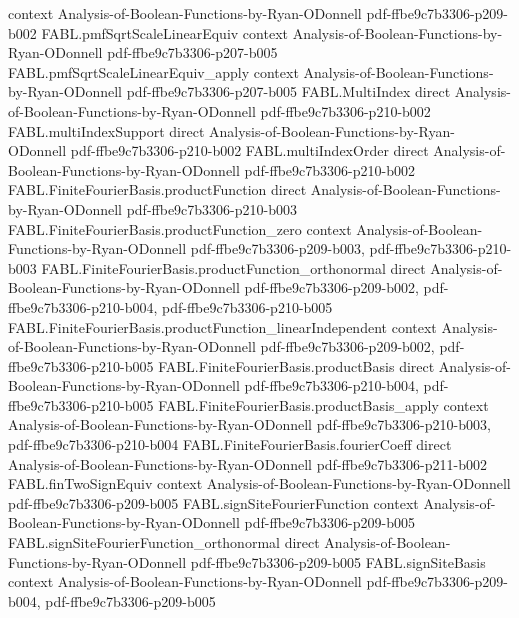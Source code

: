 \begin{theorem}
  {context}
  {Analysis-of-Boolean-Functions-by-Ryan-ODonnell}
  {pdf-ffbe9c7b3306-p209-b002}
\proofstep
  {FABL.pmfSqrtScaleLinearEquiv}
  {context}
  {Analysis-of-Boolean-Functions-by-Ryan-ODonnell}
  {pdf-ffbe9c7b3306-p207-b005}
\proofstep
  {FABL.pmfSqrtScaleLinearEquiv_apply}
  {context}
  {Analysis-of-Boolean-Functions-by-Ryan-ODonnell}
  {pdf-ffbe9c7b3306-p207-b005}
\proofstep
  {FABL.MultiIndex}
  {direct}
  {Analysis-of-Boolean-Functions-by-Ryan-ODonnell}
  {pdf-ffbe9c7b3306-p210-b002}
\proofstep
  {FABL.multiIndexSupport}
  {direct}
  {Analysis-of-Boolean-Functions-by-Ryan-ODonnell}
  {pdf-ffbe9c7b3306-p210-b002}
\proofstep
  {FABL.multiIndexOrder}
  {direct}
  {Analysis-of-Boolean-Functions-by-Ryan-ODonnell}
  {pdf-ffbe9c7b3306-p210-b002}
\proofstep
  {FABL.FiniteFourierBasis.productFunction}
  {direct}
  {Analysis-of-Boolean-Functions-by-Ryan-ODonnell}
  {pdf-ffbe9c7b3306-p210-b003}
\proofstep
  {FABL.FiniteFourierBasis.productFunction_zero}
  {context}
  {Analysis-of-Boolean-Functions-by-Ryan-ODonnell}
  {pdf-ffbe9c7b3306-p209-b003,
    pdf-ffbe9c7b3306-p210-b003}
\proofstep
  {FABL.FiniteFourierBasis.productFunction_orthonormal}
  {direct}
  {Analysis-of-Boolean-Functions-by-Ryan-ODonnell}
  {pdf-ffbe9c7b3306-p209-b002,
    pdf-ffbe9c7b3306-p210-b004,
    pdf-ffbe9c7b3306-p210-b005}
\proofstep
  {FABL.FiniteFourierBasis.productFunction_linearIndependent}
  {context}
  {Analysis-of-Boolean-Functions-by-Ryan-ODonnell}
  {pdf-ffbe9c7b3306-p209-b002,
    pdf-ffbe9c7b3306-p210-b005}
\proofstep
  {FABL.FiniteFourierBasis.productBasis}
  {direct}
  {Analysis-of-Boolean-Functions-by-Ryan-ODonnell}
  {pdf-ffbe9c7b3306-p210-b004,
    pdf-ffbe9c7b3306-p210-b005}
\proofstep
  {FABL.FiniteFourierBasis.productBasis_apply}
  {context}
  {Analysis-of-Boolean-Functions-by-Ryan-ODonnell}
  {pdf-ffbe9c7b3306-p210-b003,
    pdf-ffbe9c7b3306-p210-b004}
\proofstep
  {FABL.FiniteFourierBasis.fourierCoeff}
  {direct}
  {Analysis-of-Boolean-Functions-by-Ryan-ODonnell}
  {pdf-ffbe9c7b3306-p211-b002}
\proofstep
  {FABL.finTwoSignEquiv}
  {context}
  {Analysis-of-Boolean-Functions-by-Ryan-ODonnell}
  {pdf-ffbe9c7b3306-p209-b005}
\proofstep
  {FABL.signSiteFourierFunction}
  {context}
  {Analysis-of-Boolean-Functions-by-Ryan-ODonnell}
  {pdf-ffbe9c7b3306-p209-b005}
\proofstep
  {FABL.signSiteFourierFunction_orthonormal}
  {direct}
  {Analysis-of-Boolean-Functions-by-Ryan-ODonnell}
  {pdf-ffbe9c7b3306-p209-b005}
\proofstep
  {FABL.signSiteBasis}
  {context}
  {Analysis-of-Boolean-Functions-by-Ryan-ODonnell}
  {pdf-ffbe9c7b3306-p209-b004,
    pdf-ffbe9c7b3306-p209-b005}

\end{theorem}
